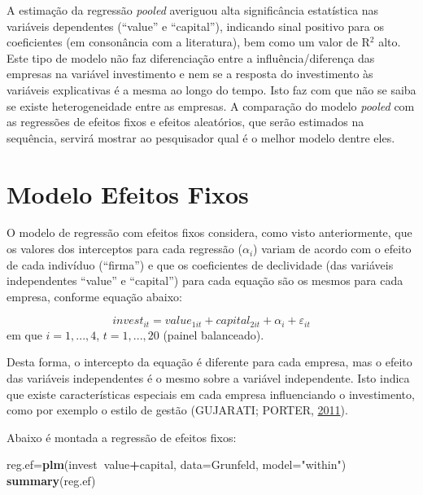 \documentclass[12pt,brazil,oneside]{book}
\newenvironment{Shaded}{\begin{snugshade}}{\end{snugshade}}
\newcommand{\DataTypeTok}[1]{\textcolor[rgb]{0.13,0.29,0.53}{#1}}
\newcommand{\KeywordTok}[1]{\textcolor[rgb]{0.13,0.29,0.53}{\textbf{#1}}}
\newcommand{\NormalTok}[1]{#1}
\newcommand{\OperatorTok}[1]{\textcolor[rgb]{0.81,0.36,0.00}{\textbf{#1}}}
\newcommand{\StringTok}[1]{\textcolor[rgb]{0.31,0.60,0.02}{#1}}
\begin{document}
A estimação da regressão \emph{pooled} averiguou alta significância estatística nas variáveis dependentes (``value'' e ``capital''), indicando sinal positivo para os coeficientes (em consonância com a literatura), bem como um valor de R\(^2\) alto. Este tipo de modelo não faz diferenciação entre a influência/diferença das empresas na variável investimento e nem se a resposta do investimento às variáveis explicativas é a mesma ao longo do tempo. Isto faz com que não se saiba se existe heterogeneidade entre as empresas. A comparação do modelo \emph{pooled} com as regressões de efeitos fixos e efeitos aleatórios, que serão estimados na sequência, servirá mostrar ao pesquisador qual é o melhor modelo dentre eles.

\hypertarget{modelo-efeitos-fixos}{%
\section{Modelo Efeitos Fixos}\label{modelo-efeitos-fixos}}

O modelo de regressão com efeitos fixos considera, como visto anteriormente, que os valores dos interceptos para cada regressão (\(\alpha_i\)) variam de acordo com o efeito de cada indivíduo (``firma'') e que os coeficientes de declividade (das variáveis independentes ``value'' e ``capital'') para cada equação são os mesmos para cada empresa, conforme equação abaixo:

\[
invest_{it} = value_{1it} + capital_{2it} + \alpha_i + \varepsilon_{it}
\]
em que \(i=1,...,4\), \(t=1,...,20\) (painel balanceado).

Desta forma, o intercepto da equação é diferente para cada empresa, mas o efeito das variáveis independentes é o mesmo sobre a variável independente. Isto indica que existe características especiais em cada empresa influenciando o investimento, como por exemplo o estilo de gestão (GUJARATI; PORTER, \protect\hyperlink{ref-Gujarati2011}{2011}).

Abaixo é montada a regressão de efeitos fixos:

\begin{Shaded}
\begin{Highlighting}[]
\NormalTok{reg.ef=}\KeywordTok{plm}\NormalTok{(invest}\OperatorTok{~}\NormalTok{value}\OperatorTok{+}\NormalTok{capital, }
           \DataTypeTok{data=}\NormalTok{Grunfeld, }\DataTypeTok{model=}\StringTok{"within"}\NormalTok{)}
\KeywordTok{summary}\NormalTok{(reg.ef)}
\end{Highlighting}
\end{Shaded}
\end{document}
